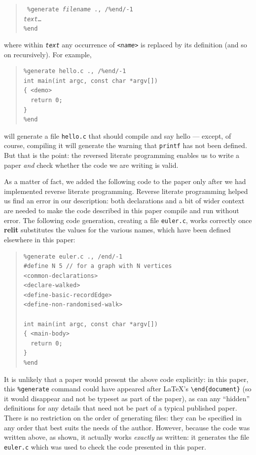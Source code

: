 \documentclass[12pt]{article}
\def\name#1{\textbf{#1}}
\begin{document}
\begin{verse}\tt
\%{}generate \emph{filename} ., /\%end/-1\\
\emph{text}\ldots\\
\%end
\end{verse}

where within \texttt{\emph{text}} any occurrence of \texttt{<\emph{name}>} is replaced by its definition (and so on recursively). For example,

\begin{quote}\begin{verbatim}
%generate hello.c ., /%end/-1
int main(int argc, const char *argv[])
{ <demo>
  return 0;
}
%end
\end{verbatim}\end{quote}

will generate a file \texttt{hello.c} that should compile and say hello --- except, of course, compiling it will generate the warning that \texttt{printf} has not been defined. But that is the point: the reversed literate programming enables us to write a paper \emph{and\/} check whether the code we are writing is valid. 

As a matter of fact, we added the following code to the paper only after we had implemented reverse literate programming. Reverse literate programming helped us find an error in our description: both declarations and a bit of wider context are needed to make the code described in this paper compile and run without error. The following code generation, creating a file \texttt{euler.c}, works correctly once \name{relit} substitutes the values for the various names, which have been defined elsewhere in this paper:

\begin{quote}\begin{verbatim}
%generate euler.c ., /end/-1
#define N 5 // for a graph with N vertices
<common-declarations>
<declare-walked>
<define-basic-recordEdge>
<define-non-randomised-walk>

int main(int argc, const char *argv[])
{ <main-body>
  return 0;
}
%end
\end{verbatim}\end{quote}

It is unlikely that a paper would present the above code explicitly: in this paper, this \texttt{\%{}generate} command could have appeared after \LaTeX's \verb|\end{document}| (so it would disappear and not be typeset as part of the paper), as can any ``hidden'' definitions for any details that need not be part of a typical published paper. There is no restriction on the order of generating files: they can be specified in any order that best suits the needs of the author. However, because the code was written above, as shown, it actually works \emph{exactly\/} as written: it generates the file \texttt{euler.c} which was used to check the code presented in this paper. 
\end{document}
